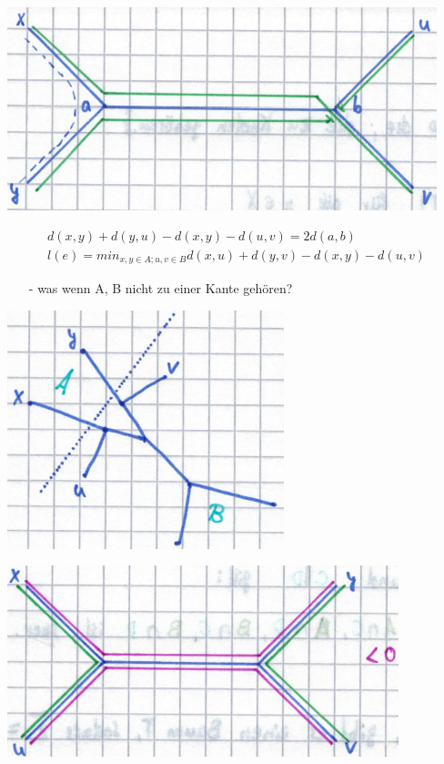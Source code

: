 \newpage

\begin{center}
	\includegraphics[scale=0.6]{lectures/161209/pix/split_two}
\end{center}

\begin{align*}
 	d(x,y) + d(y,u) - d(x,y) - d(u,v) = 2 d(a,b)\\
 	l(e) = min_{x,y \in A; u,v \in B} d(x,u) + d(y,v) - d(x,y) - d(u,v)
\end{align*} 

\begin{itemize}
	\item[-] was wenn A, B nicht zu einer Kante gehören?
\end{itemize}

\begin{center}
	\includegraphics[scale=0.6]{lectures/161209/pix/kante}
\end{center}

\begin{center}
	\includegraphics[scale=0.6]{lectures/161209/pix/split_three.png}
\end{center}

